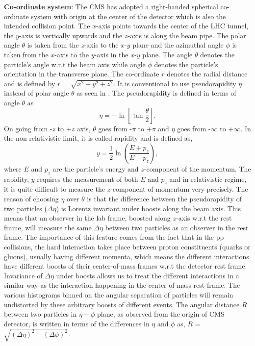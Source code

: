 \noindent
{\bf{Co-ordinate system}}: The CMS has adopted a right-handed spherical co-ordinate system with origin at the center of the detector which is also the
intended collision point. The $x$-axis points towards the center of the LHC tunnel, the $y$-axis is vertically upwards and the $z$-axis is along the beam pipe.
The polar angle $\theta$ is taken from the $z$-axis to the $x$-$y$ plane and the azimuthal angle $\phi$ is taken from the $x$-axis to the $y$-axis in the $x$-$y$ plane.
The angle $\theta$ denotes the particle's angle w.r.t the beam axis while angle $\phi$ denotes the particle's orientation in the transverse plane.
The co-ordinate $r$ denotes the radial distance and is defined by $r$ = $\sqrt{x^{2}+y^{2}+z^{2}}$.
It is conventional to use pseudorapidity $\eta$ instead of polar angle $\theta$ as 
seen in \fig{\ref{fig:CMS_longitudinal}}. The pseudorapidity is defined in terms of angle $\theta$ as
\begin{equation}
  \eta = -\ln\left[\tan\frac{\theta}{2}\right].
\end{equation}
On going from -$z$ to +$z$ axis, $\theta$ goes from -$\pi$ to +$\pi$ and $\eta$ goes from -$\infty$ to +$\infty$. In the non-relativistic limit,
it is called rapidity and is defined as,
\begin{equation}
  y = \frac{1}{2}\ln\left(\frac{E + p_{z}}{E - p_{z}}\right),
\end{equation}
where $E$ and $p_{z}$ are the particle's energy and $z$-component of the momentum. The rapidity, $y$ requires the measurement
of both $E$ and $p_{z}$ and in relativistic regime, it is quite difficult to measure the $z$-component of momentum very precisely.
The reason of choosing $\eta$ over $\theta$ is that the difference between
the pseudorapidity of two particles ($\Delta\eta$) is Lorentz invariant under boosts along the beam axis. This means that an observer in the lab frame, boosted
along $z$-axis w.r.t the rest frame, will measure the same $\Delta\eta$ between two particles as an observer in the rest frame.
The importance of this feature comes from the fact that in the pp collisions, the hard interaction takes place between proton constituents (quarks or gluons),
usually having different momenta, which means the different interactions have different boosts of their center-of-mass frames w.r.t the detector rest frame.
Invariance of $\Delta\eta$ under boosts allows us to treat the different interactions in a similar way as the interaction happening in the center-of-mass rest frame.
The various histograms binned on the angular separation of particles will remain undistorted by these arbitrary boosts of different events.
The angular distance $R$ between two particles in $\eta-\phi$ plane, as observed from the origin of CMS detector,
is written in terms of the differences in $\eta$ and $\phi$ as, $R$ = $\sqrt{({\Delta\eta})^{2}+({\Delta\phi})^{2}}$.


